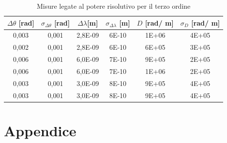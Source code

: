 \documentclass{article}
\begin{document}
        \begin{table}[H]
            \centering
            \begin{tabular}{c c c c c c }
                \toprule 
                $\Delta \theta$ [rad] &$\sigma_{\Delta \theta}$ [rad] & $\Delta \lambda$[m]  & $\sigma_{\Delta \lambda}$ [m] & $D$ [rad/ m] & $\sigma_D$ [rad/ m] \\
                \midrule
                0,003	&	0,001	&	2,8E-09	&	6E-10	&	1E+06	&	4E+05\\
                0,002	&	0,001	&	2,8E-09	&	6E-10	&	6E+05	&	3E+05\\
                0,006	&	0,001	&	6,0E-09	&	7E-10	&	9E+05	&	2E+05\\
                0,006	&	0,001	&	6,0E-09	&	7E-10	&	1E+06	&	2E+05\\
                0,003	&	0,001	&	3,0E-09	&	8E-10	&	9E+05	&	4E+05\\
                0,003	&	0,001	&	3,0E-09	&	8E-10	&	9E+05	&	4E+05\\
                \bottomrule
            \end{tabular}
            \caption{Misure legate al potere risolutivo per il terzo ordine}
            \label{D ordine 3}
        \end{table}


    \section{Appendice}
    \label{Appendice}
        
\end{document}
